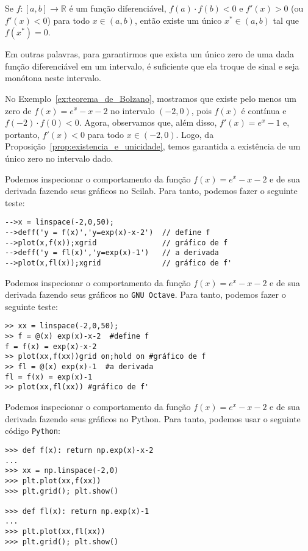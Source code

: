 \begin{prop}\label{prop:existencia_e_unicidade}
Se $f:[a, b]\to\mathbb{R}$ é um função diferenciável, $f(a)\cdot f(b)<0$ e $f'(x)>0$ (ou $f'(x)<0$) para todo $x\in(a, b)$, então existe um único $x^*\in (a, b)$ tal que $f(x^*) = 0$.
\end{prop}

Em outras palavras, para garantirmos que exista um único zero de uma dada função diferenciável em um intervalo, é suficiente que ela troque de sinal e seja monótona neste intervalo.

\begin{ex}
No Exemplo~\ref{ex:teorema_de_Bolzano}, mostramos que existe pelo menos um zero de $f(x) = e^{x}-x-2$ no intervalo $(-2,0)$, pois $f(x)$ é contínua e $f(-2)\cdot f(0) < 0$. Agora, observamos que, além disso, $f'(x)=e^x-1$ e, portanto, $f'(x) < 0$ para todo $x\in(-2,0)$. Logo, da Proposição~\ref{prop:existencia_e_unicidade}, temos garantida a existência de um único zero no intervalo dado.

\ifisscilab
Podemos inspecionar o comportamento da função $f(x)= e^x - x - 2$ e de sua derivada fazendo seus gráficos no Scilab. Para tanto, podemos fazer o seguinte teste:
\begin{verbatim}
-->x = linspace(-2,0,50);
-->deff('y = f(x)','y=exp(x)-x-2')  // define f
-->plot(x,f(x));xgrid               // gráfico de f
-->deff('y = fl(x)','y=exp(x)-1')   // a derivada
-->plot(x,fl(x));xgrid              // gráfico de f'
\end{verbatim}
\fi
\ifisoctave
Podemos inspecionar o comportamento da função $f(x)= e^x - x - 2$ e de sua derivada fazendo seus gráficos no \verb+GNU Octave+. Para tanto, podemos fazer o seguinte teste:
\begin{verbatim}
>> xx = linspace(-2,0,50);
>> f = @(x) exp(x)-x-2  #define f
f = f(x) = exp(x)-x-2
>> plot(xx,f(xx))grid on;hold on #gráfico de f
>> fl = @(x) exp(x)-1  #a derivada
fl = f(x) = exp(x)-1
>> plot(xx,fl(xx)) #gráfico de f'
\end{verbatim}
\fi
\ifispython
Podemos inspecionar o comportamento da função $f(x)= e^x - x - 2$ e de sua derivada fazendo seus gráficos no Python. Para tanto, podemos usar o seguinte código \verb+Python+:
\begin{verbatim}
>>> def f(x): return np.exp(x)-x-2
...
>>> xx = np.linspace(-2,0)
>>> plt.plot(xx,f(xx))
>>> plt.grid(); plt.show()

>>> def fl(x): return np.exp(x)-1
...
>>> plt.plot(xx,fl(xx))
>>> plt.grid(); plt.show()
\end{verbatim}
\fi
\end{ex}

